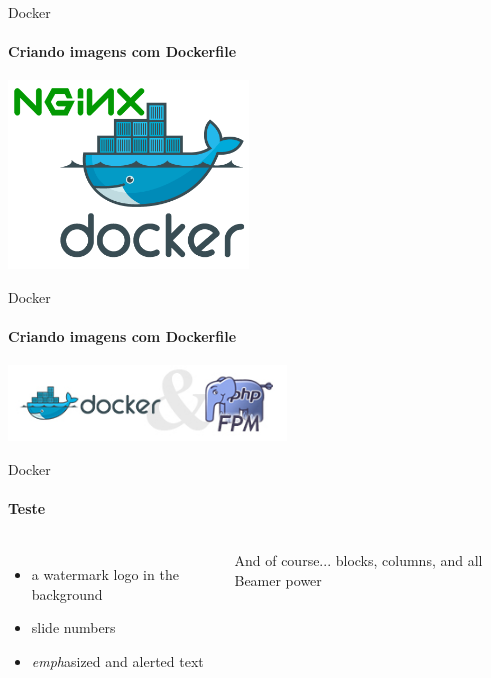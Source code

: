 \documentclass{beamer}
\begin{document}
\begin{frame}{Docker}
    \framesubtitle{Criando imagens com Dockerfile}
    \href{https://github.com/agnaldom/curso-docker/blob/master/images/nginx/Dockerfile}{\includegraphics[height=5cm]{img/docker-nginx.png}}
\end{frame}
\begin{frame}{Docker}
    \framesubtitle{Criando imagens com Dockerfile}
    \includegraphics[height=2cm]{img/docker-php.png}
\end{frame}
\begin{frame}{Docker}
  \framesubtitle{Teste}
  \begin{columns}
      \begin{itemize}
        \item a \alert{watermark} logo in the background
        \item slide \alert{numbers}
        \item \emph{emph}asized and \alert{alert}ed text
      \end{itemize}

      \begin{block}{And of course...}
         blocks, columns, and all Beamer power
      \end{block}
  \end{columns}
\end{frame}



\setwatermark{\fontsize{125pt}{125pt}\selectfont{Simple}}
\end{document}
